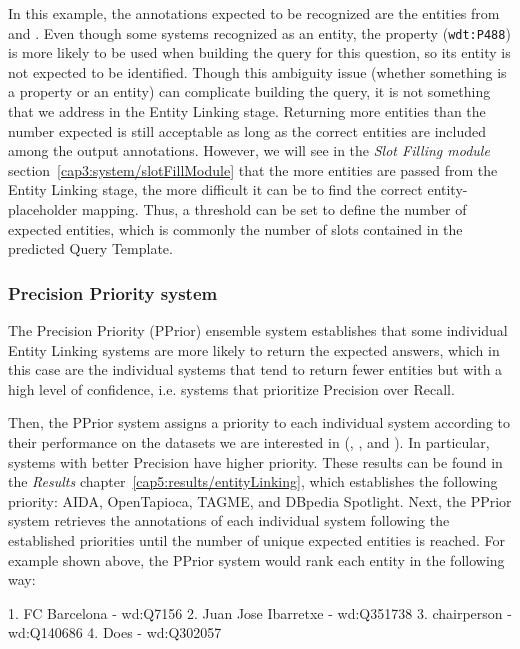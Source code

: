 In this example, the annotations expected to be recognized are the entities from  and . Even though some systems recognized 
 as an entity, the property  (\texttt{wdt:P488}) 
is more likely to be used when building the \SPARQL{} query for this question, so its entity is 
not expected to be identified. Though this ambiguity issue (whether something is a property or 
an entity) can complicate building the \SPARQL{} query, it is not something that we address in 
the Entity Linking stage. Returning more entities than the number expected is still acceptable 
as long as the correct entities are included among the output annotations. However, we will 
see in the \textit{Slot Filling module} section~\ref{cap3:system/slotFillModule} that the more 
entities are passed from the Entity Linking stage, the more difficult it can be to find the 
correct entity-placeholder mapping. Thus, a threshold can be set to define the number of 
expected entities, which is commonly the number of slots contained in the predicted Query 
Template.

\subsubsection{Precision Priority system}
\label{cap3:system/entLinModule/ensembleSystems/pprior}
The Precision Priority (PPrior) ensemble system establishes that some individual Entity 
Linking systems are more likely to return the expected answers, which in this case are the 
individual systems that tend to return fewer entities but with a high level of confidence, 
i.e. systems that prioritize Precision over Recall.

Then, the PPrior system assigns a priority to each individual system according to their 
performance on the datasets we are interested in (\LCQuADtwo, \DBNQA, and \QALDseven). In 
particular, systems with better Precision have higher priority. These results can be found in 
the \textit{Results} chapter~\ref{cap5:results/entityLinking}, 
which establishes the following priority: AIDA, OpenTapioca, TAGME, and DBpedia Spotlight. Next, 
the PPrior system retrieves the annotations of each individual system following the established 
priorities until the number of unique expected entities is reached. 
For example shown above, the PPrior system would rank each entity in the following way:

\begin{sparqlcode}[]
1. FC Barcelona - wd:Q7156
2. Juan Jose Ibarretxe - wd:Q351738
3. chairperson - wd:Q140686
4. Does - wd:Q302057     
\end{sparqlcode}

